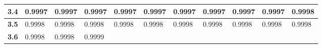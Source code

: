 \begin{alternateColorTable}
\begin{longtable}{|l|l|l|l|l|l|l|l|l|l|l|}
    \textbf{3.4}  & 0.9997  & 0.9997  & 0.9997  & 0.9997  & 0.9997  & 0.9997  & 0.9997  & 0.9997  & 0.9997  & 0.9998\\ \hline
    
    \textbf{3.5}  & 0.9998  & 0.9998  & 0.9998  & 0.9998  & 0.9998  & 0.9998  & 0.9998  & 0.9998  & 0.9998  & 0.9998\\ \hline
    
    \textbf{3.6}  & 0.9998  & 0.9998  & 0.9999 &         &           &       &           &       &           &       \\ \hline
\end{longtable}
\end{alternateColorTable}
\renewcommand{\arraystretch}{1}


\changefontsizes{11pt}










